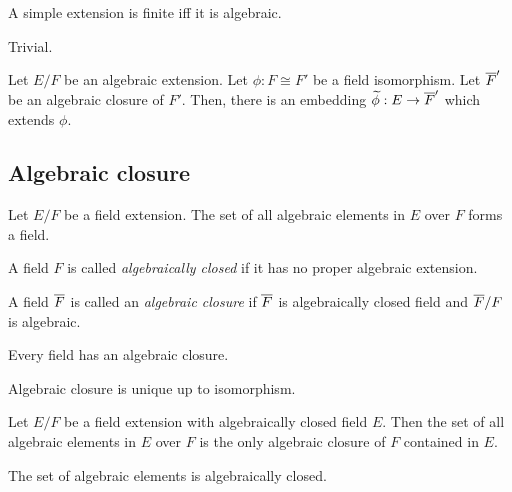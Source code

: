 \documentclass{../exp}
\begin{document}
\begin{prop}
A simple extension is finite iff it is algebraic.
\end{prop}
\begin{pf} Trivial. \end{pf}

\begin{thm}
Let $E/F$ be an algebraic extension.
Let $\phi:F\cong F'$ be a field isomorphism.
Let $\overline F'$ be an algebraic closure of $F'$.
Then, there is an embedding $\tld\phi:E\to\cl F'$ which extends $\phi$.
\end{thm}
\begin{pf}
\end{pf}






\subsection{Algebraic closure}

\begin{thm}
Let $E/F$ be a field extension.
The set of all algebraic elements in $E$ over $F$ forms a field.
\end{thm}
\begin{pf}
\end{pf}




\begin{defn}
A field $F$ is called \emph{algebraically closed} if it has no proper algebraic extension.
\end{defn}

\begin{defn}
A field $\overline F$ is called an \emph{algebraic closure} if $\overline F$ is algebraically closed field and $\overline F/F$ is algebraic.
\end{defn}

\begin{thm}
Every field has an algebraic closure.
\end{thm}
\begin{pf}
\end{pf}

\begin{thm}
Algebraic closure is unique up to isomorphism.
\end{thm}
\begin{pf}
\end{pf}

\begin{prop}
Let $E/F$ be a field extension with algebraically closed field $E$.
Then the set of all algebraic elements in $E$ over $F$ is the only algebraic closure of $F$ contained in $E$.
\end{prop}
\begin{pf}
The set of algebraic elements is algebraically closed.
\end{pf}
\end{document}
